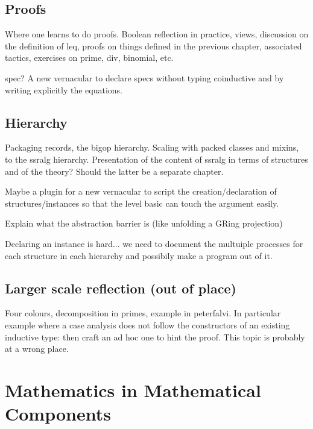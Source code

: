 \documentclass{book}
\begin{document}
\chapter{Proofs}

Where one learns to do proofs.
Boolean reflection in practice, views, discussion on the definition of leq,
proofs on things defined in the
previous chapter, associated tactics, exercises on prime, div,
binomial, etc.

spec? A new vernacular to declare specs without typing coinductive and
by writing explicitly the equations.





\chapter{Hierarchy}
Packaging records, the bigop hierarchy.
Scaling with packed classes and mixins, to the ssralg
hierarchy. Presentation of the content of ssralg in terms of structures
and of the theory? Should the latter be a separate chapter.

Maybe a plugin for a new vernacular to script the creation/declaration
of structures/instances so that the level basic can touch the argument
easily.

Explain what the abstraction barrier is (like unfolding a GRing projection)



Declaring an instance is hard... we need to document the multuiple processes 
for each structure in each hierarchy and possibily make a program out of it.

\chapter{Larger scale reflection (out of place)}
Four colours, decomposition in primes, example in peterfalvi. In
particular example where a case analysis does not follow the
constructors of an existing inductive type: then craft an ad hoc one
to hint the proof. This topic is probably at a wrong place.

\part{Mathematics in Mathematical Components}
\end{document}
